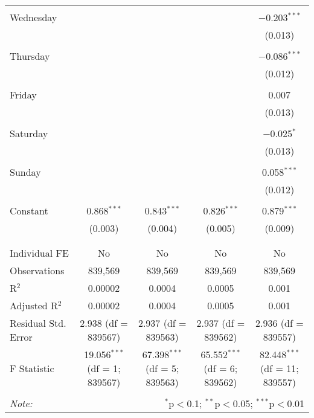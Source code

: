 \documentclass[
]{article}
\begin{document}
\begin{table}[!htbp]
{\begin{tabular}{@{\extracolsep{5pt}}lcccc}
  & & & & \\ 
 Wednesday &  &  &  & $-$0.203$^{***}$ \\ 
  &  &  &  & (0.013) \\ 
  & & & & \\ 
 Thursday &  &  &  & $-$0.086$^{***}$ \\ 
  &  &  &  & (0.012) \\ 
  & & & & \\ 
 Friday &  &  &  & 0.007 \\ 
  &  &  &  & (0.013) \\ 
  & & & & \\ 
 Saturday &  &  &  & $-$0.025$^{*}$ \\ 
  &  &  &  & (0.013) \\ 
  & & & & \\ 
 Sunday &  &  &  & 0.058$^{***}$ \\ 
  &  &  &  & (0.012) \\ 
  & & & & \\ 
 Constant & 0.868$^{***}$ & 0.843$^{***}$ & 0.826$^{***}$ & 0.879$^{***}$ \\ 
  & (0.003) & (0.004) & (0.005) & (0.009) \\ 
  & & & & \\ 
\hline \\[-1.8ex] 
Individual FE & No & No & No & No \\ 
Observations & 839,569 & 839,569 & 839,569 & 839,569 \\ 
R$^{2}$ & 0.00002 & 0.0004 & 0.0005 & 0.001 \\ 
Adjusted R$^{2}$ & 0.00002 & 0.0004 & 0.0005 & 0.001 \\ 
Residual Std. Error & 2.938 (df = 839567) & 2.937 (df = 839563) & 2.937 (df = 839562) & 2.936 (df = 839557) \\ 
F Statistic & 19.056$^{***}$ (df = 1; 839567) & 67.398$^{***}$ (df = 5; 839563) & 65.552$^{***}$ (df = 6; 839562) & 82.448$^{***}$ (df = 11; 839557) \\ 
\hline 
\hline \\[-1.8ex] 
\textit{Note:}  & \multicolumn{4}{r}{$^{*}$p$<$0.1; $^{**}$p$<$0.05; $^{***}$p$<$0.01} \\ 
\end{tabular}
} 
\end{table} 
\newpage
\end{document}

